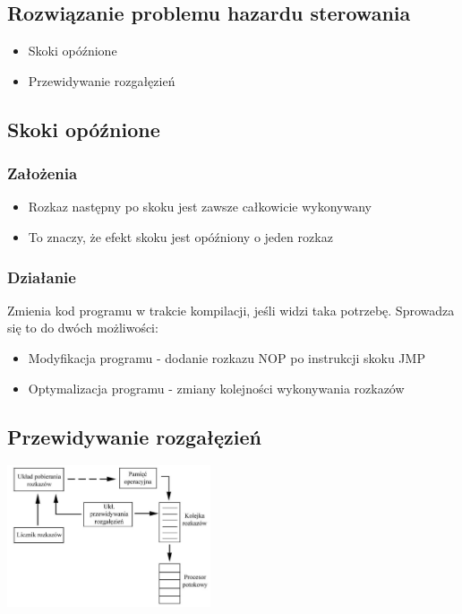    	\subsection{Rozwiązanie problemu hazardu sterowania}
	   	\begin{itemize}
	   		\item Skoki opóźnione
	   		\item Przewidywanie rozgałęzień
	   	\end{itemize}
	   	
   	\subsection{Skoki opóźnione}
	   	\subsubsection{Założenia}
		   	\begin{itemize}
		   		\item Rozkaz następny po skoku jest zawsze całkowicie wykonywany
		   		\item To znaczy, że efekt skoku jest opóźniony o jeden rozkaz
		   	\end{itemize}
   		\subsubsection{Działanie}
   			Zmienia kod programu w trakcie kompilacji, jeśli widzi taka potrzebę. Sprowadza się to do dwóch możliwości:
		   	\begin{itemize}
		   		\item Modyfikacja programu - dodanie rozkazu NOP po instrukcji skoku JMP
		   		\item Optymalizacja programu - zmiany kolejności wykonywania rozkazów
		   	\end{itemize}
		   	
   	\subsection{Przewidywanie rozgałęzień}
   		\begin{center}
   			\includegraphics[width=0.45\textwidth]{./images/potok04}
   		\end{center}
